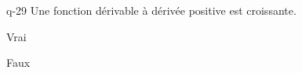 \begin{truefalse}{q-29}
Une fonction dérivable à dérivée positive est croissante.
\item Vrai
\item* Faux
\end{truefalse}

